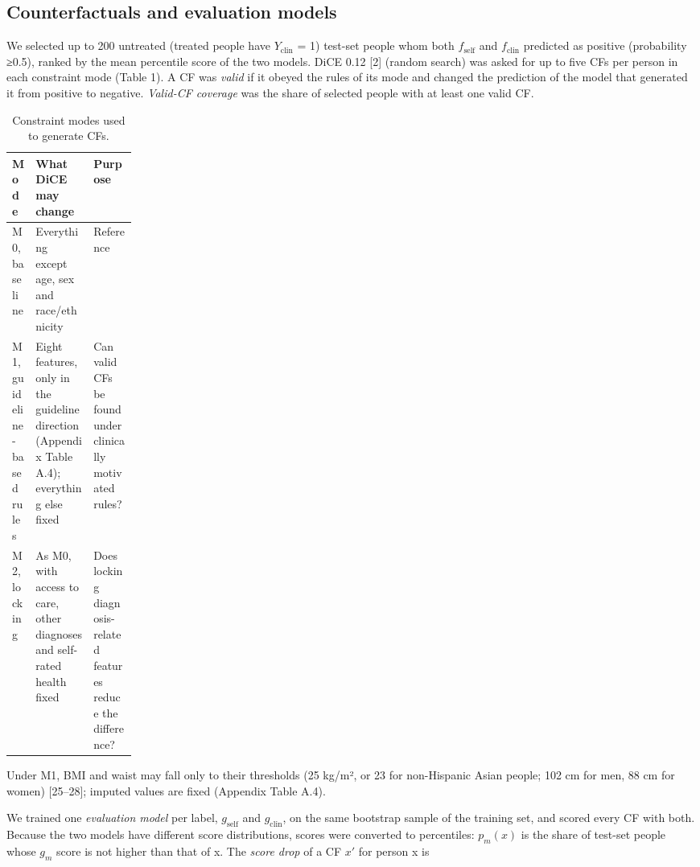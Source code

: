 \documentclass[preprint,review,12pt,times]{elsarticle}
\begin{document}
\subsection{Counterfactuals and evaluation models}

We selected up to 200 untreated (treated people have
\(Y_{\mathrm{clin}}\) = 1) test-set people whom both
\(f_{\mathrm{self}}\) and \(f_{\mathrm{clin}}\) predicted as positive
(probability ≥0.5), ranked by the mean percentile score of the two
models. DiCE 0.12 {[}2{]} (random search) was asked for up to five CFs
per person in each constraint mode (Table 1). A CF was \emph{valid} if
it obeyed the rules of its mode and changed the prediction of the model
that generated it from positive to negative. \emph{Valid-CF coverage}
was the share of selected people with at least one valid CF.

\begin{table}[!htbp]
\caption{Constraint modes used to generate CFs.}
\label{tab1}
\footnotesize{}\selectfont\renewcommand{\arraystretch}{1.1}
\begin{tabularx}{\textwidth}{>{\raggedright\arraybackslash}p{0.18\linewidth}>{\raggedright\arraybackslash}X>{\raggedright\arraybackslash}X}
\toprule
\textbf{Mode} & \textbf{What DiCE may change} & \textbf{Purpose} \\ \midrule
M0, baseline & Everything except age, sex and race/ethnicity & Reference \\
M1, guideline-based rules & Eight features, only in the guideline direction (Appendix Table A.4); everything else fixed & Can valid CFs be found under clinically motivated rules? \\
M2, locking & As M0, with access to care, other diagnoses and self-rated health fixed & Does locking diagnosis-related features reduce the difference? \\
\bottomrule
\end{tabularx}
\end{table}

Under M1, BMI and waist may fall only to their thresholds (25 kg/m², or
23 for non-Hispanic Asian people; 102 cm for men, 88 cm for women)
{[}25--28{]}; imputed values are fixed (Appendix Table A.4).

We trained one \emph{evaluation model} per label, \(g_{\mathrm{self}}\)
and \(g_{\mathrm{clin}}\), on the same bootstrap sample of the training
set, and scored every CF with both. Because the two models have
different score distributions, scores were converted to percentiles:
\(p_m(x)\) is the share of test-set people whose \(g_m\) score is not
higher than that of x. The \emph{score drop} of a CF \(x'\) for person x
is
\end{document}
